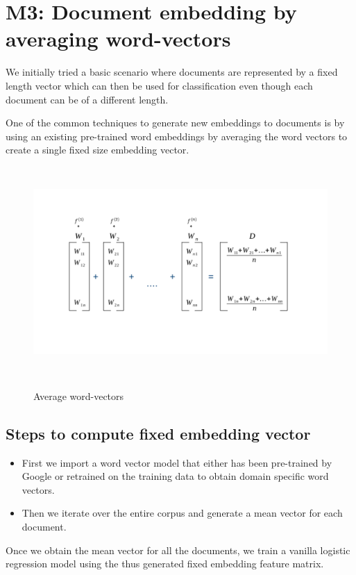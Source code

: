 
\section{M3: Document embedding by averaging word-vectors}

We initially tried a basic scenario where documents are represented by a fixed length vector which can then be used for classification even though each document can be of a different length.

One of the common techniques to generate new embeddings to documents is by using an existing pre-trained word embeddings by averaging the word vectors to create a single fixed size embedding vector.

\begin{figure}[htbp]
\centering
\includegraphics[width=16cm, height=8cm]{images/average-vectors.png}\\
\centering
\caption{Average word-vectors}
\label{fig:foo}
\end{figure}

\subsection{Steps to compute fixed embedding vector}

\begin{itemize}
\item {First we import a word vector model that either has been pre-trained by Google or retrained on the training data to obtain domain specific word vectors.}
\item {Then we iterate over the entire corpus and generate a mean vector for each document.}
\end{itemize}
Once we obtain the mean vector for all the documents, we train a vanilla logistic regression model using the thus generated fixed embedding feature matrix.

